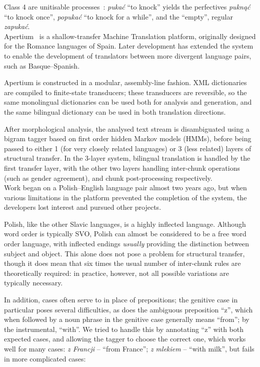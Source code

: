 \documentclass[11pt]{article}
\begin{document}
Class 4 are unitisable processes~\cite{aalstein07}: {\it puka\'{c}}
``to knock'' yields the perfectives {\it pukn\k{a}\'{c}} ``to knock once'', 
{\it popuka\'{c}} ``to knock for a while'', and the ``empty'', regular 
{\it zapuka\'{c}}.\\

Apertium~\cite{corbi05oss} is a shallow-transfer Machine Translation platform,
originally designed for the Romance languages of Spain. Later development has
extended the system to enable the development of translators between more
divergent language pairs, such as Basque--Spanish\cite{ginesti09}.

Apertium is constructed in a modular, assembly-line fashion. XML dictionaries
are compiled to finite-state transducers; these transducers are reversible, so
the same monolingual dictionaries can be used both for analysis and generation,
and the same bilingual dictionary can be used in both translation directions.

After morphological analysis, the analysed text stream is disambiguated using
a bigram tagger based on first order hidden Markov models (HMMs), before
being passed to either 1 (for very closely related languages) or 3 
(less related) layers of structural transfer. In the 3-layer system,
bilingual translation is handled by the first transfer layer, with the
other two layers handling inter-chunk operations (such as gender 
agreement), and chunk post-processing respectively.\\

Work began on a Polish--English language pair almost two years ago,
but when various limitations in the platform prevented the completion of
the system, the developers lost interest and pursued other projects.

Polish, like the other Slavic languages, is a highly
inflected language. Although word order is typically SVO, Polish can almost
be considered to be a free word order language, with inflected endings
{\it usually} providing the distinction between subject and object. This 
alone does not pose a problem for structural transfer, though it does
mean that six times the usual number of inter-chunk rules are theoretically
required: in practice, however, not all possible variations are typically 
necessary. 

In addition, cases often serve to in place of prepositions; the genitive
case in particular poses several difficulties, as does the ambiguous
preposition ``z'', which when followed by a noun phrase in the genitive
case generally means ``from''; by the instrumental, ``with''. We tried
to handle this by annotating ``z'' with both expected cases, and
allowing the tagger to choose the correct one, which works well for
many cases: {\it z Francji} -- ``from France''; {\it z mlekiem} --
``with milk'', but fails in more complicated cases:
\end{document}
